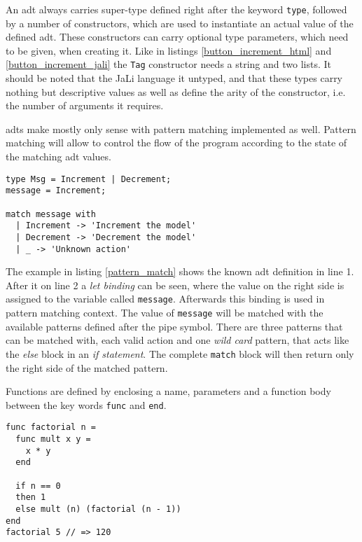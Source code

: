 An \gls{adt} always carries super-type defined right after the keyword \texttt{type}, followed by a number of constructors, which are used to instantiate an actual value of the defined \gls{adt}. These constructors can carry optional type parameters, which need to be given, when creating it. Like in listings \ref{button_increment_html} and \ref{button_increment_jali} the \texttt{Tag} constructor needs a string and two lists. It should be noted that the JaLi language it untyped, and that these types carry nothing but descriptive values as well as define the arity of the constructor, i.e. the number of arguments it requires. 

\glspl{adt} make mostly only sense with pattern matching implemented as well. Pattern matching will allow to control the flow of the program according to the state of the matching \gls{adt} values.

\begin{lstlisting}[columns=fullflexible, label={pattern_match}, language=JaLi, caption=Pattern matching on Msg]
type Msg = Increment | Decrement;
message = Increment;

match message with
  | Increment -> 'Increment the model'
  | Decrement -> 'Decrement the model'
  | _ -> 'Unknown action'
\end{lstlisting}

The example in listing \ref{pattern_match} shows the known \gls{adt} definition in line 1. After it on line 2 a \textit{let binding} can be seen, where the value on the right side is assigned to the variable called \texttt{message}. Afterwards this binding is used in pattern matching context. The value of \texttt{message} will be matched with the available patterns defined after the pipe symbol. There are three patterns that can be matched with, each valid action and one \textit{wild card} pattern, that acts like the \textit{else} block in an \textit{if statement}. The complete \texttt{match} block will then return only the right side of the matched pattern.

Functions are defined by enclosing a name, parameters and a function body between the key words \texttt{func} and \texttt{end}.

\begin{lstlisting}[columns=fullflexible, label={inner_functions}, language=JaLi, caption={Inner functions and recursion shown on factorial}]
func factorial n =
  func mult x y =
    x * y
  end
  
  if n == 0
  then 1
  else mult (n) (factorial (n - 1))
end
factorial 5 // => 120
\end{lstlisting}

